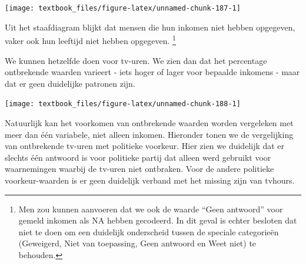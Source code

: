\documentclass[]{tufte-book}
\newenvironment{Shaded}{}{}
\newcommand{\DataTypeTok}[1]{\textcolor[rgb]{0.56,0.13,0.00}{#1}}
\newcommand{\KeywordTok}[1]{\textcolor[rgb]{0.00,0.44,0.13}{\textbf{#1}}}
\newcommand{\NormalTok}[1]{#1}
\newcommand{\OperatorTok}[1]{\textcolor[rgb]{0.40,0.40,0.40}{#1}}
\newcommand{\StringTok}[1]{\textcolor[rgb]{0.25,0.44,0.63}{#1}}
\begin{document}
\texttt{[image: textbook\_files/figure-latex/unnamed-chunk-187-1]}

Uit het staafdiagram blijkt dat mensen die hun inkomen niet hebben opgegeven, vaker ook hun leeftijd niet hebben opgegeven. \footnote{Men zou kunnen aanvoeren dat we ook de waarde ``Geen antwoord'' voor gemeld inkomen als NA hebben gecodeerd. In dit geval is echter besloten dat niet te doen om een duidelijk onderscheid tussen de speciale categorieën (Geweigerd, Niet van toepassing, Geen antwoord en Weet niet) te behouden.}

We kunnen hetzelfde doen voor tv-uren. We zien dan dat het percentage ontbrekende waarden varieert - iets hoger of lager voor bepaalde inkomens - maar dat er geen duidelijke patronen zijn.

\begin{Shaded}
\end{Shaded}

\texttt{[image: textbook\_files/figure-latex/unnamed-chunk-188-1]}

Natuurlijk kan het voorkomen van ontbrekende waarden worden vergeleken met meer dan één variabele, niet alleen inkomen. Hieronder tonen we de vergelijking van ontbrekende tv-uren met politieke voorkeur. Hier zien we duidelijk dat er slechts één antwoord is voor politieke partij dat alleen werd gebruikt voor waarnemingen waarbij de tv-uren niet ontbraken. Voor de andere politieke voorkeur-waarden is er geen duidelijk verband met het missing zijn van tvhours.

\begin{Shaded}
\end{Shaded}
\end{document}
